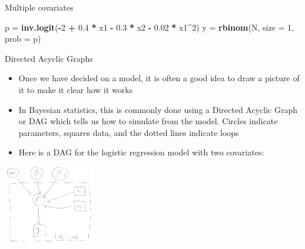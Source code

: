 \documentclass[ignorenonframetext,]{beamer}
\newenvironment{Shaded}{\begin{snugshade}}{\end{snugshade}}
\newcommand{\KeywordTok}[1]{\textcolor[rgb]{0.13,0.29,0.53}{\textbf{#1}}}
\newcommand{\DataTypeTok}[1]{\textcolor[rgb]{0.13,0.29,0.53}{#1}}
\newcommand{\DecValTok}[1]{\textcolor[rgb]{0.00,0.00,0.81}{#1}}
\newcommand{\FloatTok}[1]{\textcolor[rgb]{0.00,0.00,0.81}{#1}}
\newcommand{\StringTok}[1]{\textcolor[rgb]{0.31,0.60,0.02}{#1}}
\newcommand{\OperatorTok}[1]{\textcolor[rgb]{0.81,0.36,0.00}{\textbf{#1}}}
\newcommand{\NormalTok}[1]{#1}
\providecommand{\tightlist}{%
  \setlength{\itemsep}{0pt}\setlength{\parskip}{0pt}}
\begin{document}
\begin{frame}[fragile]{Multiple covariates}
\begin{Shaded}
\begin{Highlighting}[]
\NormalTok{p =}\StringTok{ }\KeywordTok{inv.logit}\NormalTok{(}\OperatorTok{-}\DecValTok{2} \OperatorTok{+}\StringTok{ }\FloatTok{0.4} \OperatorTok{*}\StringTok{ }\NormalTok{x1 }\OperatorTok{-}\StringTok{ }\FloatTok{0.3} \OperatorTok{*}\StringTok{ }\NormalTok{x2 }\OperatorTok{-}\StringTok{ }\FloatTok{0.02} \OperatorTok{*}\StringTok{ }\NormalTok{x1}\OperatorTok{^}\DecValTok{2}\NormalTok{)}
\NormalTok{y =}\StringTok{ }\KeywordTok{rbinom}\NormalTok{(N, }\DataTypeTok{size =} \DecValTok{1}\NormalTok{, }\DataTypeTok{prob =}\NormalTok{ p)}
\end{Highlighting}
\end{Shaded}

\end{frame}

\begin{frame}{Directed Acyclic Graphs}

\begin{itemize}
\tightlist
\item
  Once we have decided on a model, it is often a good idea to draw a
  picture of it to make it clear how it works
\item
  In Bayesian statistics, this is commonly done using a Directed Acyclic
  Graph or DAG which tells us how to simulate from the model. Circles
  indicate parameters, squares data, and the dotted lines indicate loops
\item
  Here is a DAG for the logistic regression model with two covariates:
\end{itemize}

\begin{center}
\includegraphics[width=4cm]{DAG.pdf}
\end{center}

\end{frame}
\end{document}
